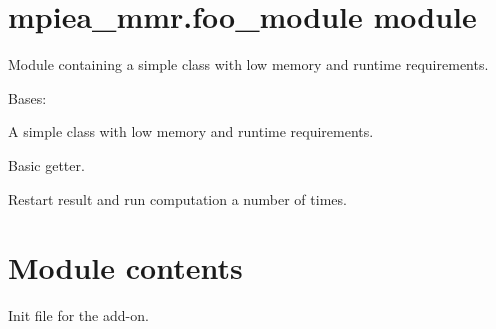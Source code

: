 \documentclass[letterpaper,10pt,english,openany,oneside]{sphinxmanual}
\begin{document}
\section{mpiea\_mmr.foo\_module module}
\label{\detokenize{mpiea_mmr:module-mpiea_mmr.foo_module}}\label{\detokenize{mpiea_mmr:mpiea-mmr-foo-module-module}}
Module containing a simple class with low memory and runtime requirements.

\begin{fulllineitems}
\label{\detokenize{mpiea_mmr:mpiea_mmr.foo_module.Foo}}
Bases: 

A simple class with low memory and runtime requirements.

\begin{fulllineitems}
\label{\detokenize{mpiea_mmr:mpiea_mmr.foo_module.Foo.get_result}}
Basic getter.

\end{fulllineitems}


\begin{fulllineitems}
\label{\detokenize{mpiea_mmr:mpiea_mmr.foo_module.Foo.loop}}
Restart result and run computation a number of times.

\end{fulllineitems}


\end{fulllineitems}



\section{Module contents}
\label{\detokenize{mpiea_mmr:module-mpiea_mmr}}\label{\detokenize{mpiea_mmr:module-contents}}
Init file for the add-on.
\end{document}
